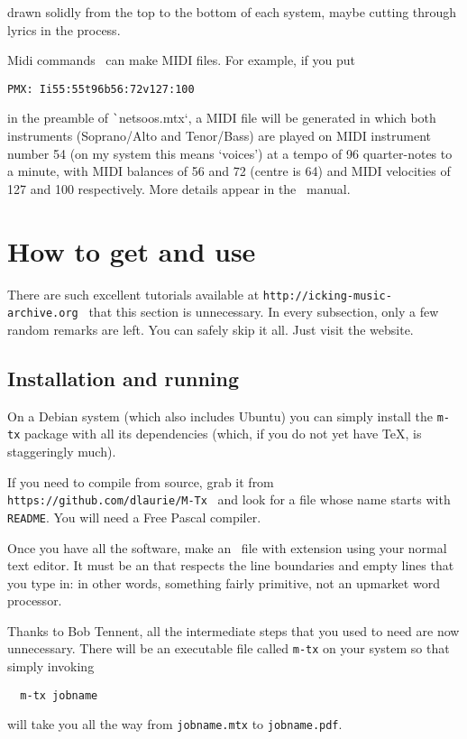 \documentclass[11pt]{article}
\newcommand{\archiveSite}{
 \texttt{http://icking-music-archive.org}
}
\newcommand{\repository}{
\texttt{https://github.com/dlaurie/M-Tx}
}
\begin{document}
\begin{description}
  drawn solidly 
  from the top to the bottom of each system, maybe
  cutting through lyrics in the process. 
  \item{Midi commands}  \PMX\ can make MIDI files.  For example, if you put
\begin{verbatim}
PMX: Ii55:55t96b56:72v127:100
\end{verbatim}
in the preamble of \texttt`netsoos.mtx`, a MIDI file will be generated 
in which both instruments (Soprano/Alto and Tenor/Bass) are played on 
MIDI instrument number 54 (on my system this means `voices') at a tempo 
of 96 quarter-notes to a minute, with MIDI balances of 56 and 72 (centre 
is 64) and MIDI velocities of 127 and 100 respectively.  More details 
appear in the \PMX\ manual.  
\end{description}

\section{How to get and use \MTx}

There are such excellent tutorials available at \archiveSite\ that 
this section is unnecessary. In every subsection, only a few random 
remarks are left. You can safely skip it all. Just visit the website.

\subsection{Installation and running} \label{Archive}

On a Debian system (which also includes Ubuntu) you can simply
install the \verb`m-tx` package with all its dependencies (which,
if you do not yet have \TeX, is staggeringly much).

If you need to compile from source, grab it from \repository\ and
look for a file whose name starts with \verb`README`. You will
need a Free Pascal compiler.
 
Once you have all the software, make an \MTx\ file with extension 
 using your normal text editor.  It must be an  that
respects the line boundaries and empty lines that you type in: in other 
words, something fairly primitive, not an upmarket word processor.

Thanks to Bob Tennent, all the intermediate steps that you used to
need are now unnecessary. There will be an executable file called
\verb`m-tx` on your system so that simply invoking 
\begin{verbatim}
  m-tx jobname
\end{verbatim}
will take you all the way from \verb`jobname.mtx` to \verb`jobname.pdf`.
\end{document}
